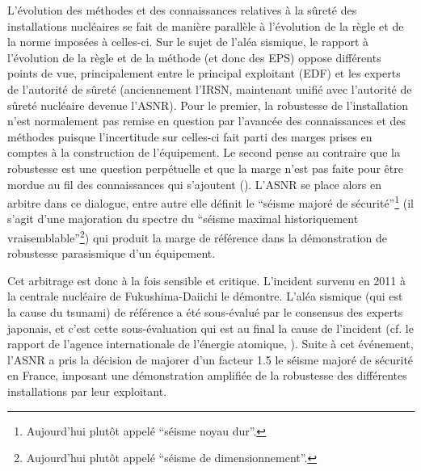 L'évolution des méthodes et des connaissances relatives à la sûreté des installations nucléaires se fait de manière parallèle à l'évolution de la règle et de la norme imposées à celles-ci. 
Sur le sujet de l'aléa sismique, le rapport à l'évolution de la règle et de la méthode (et donc des EPS) oppose différents points de vue, principalement entre le principal exploitant (EDF) et les experts de l'autorité de sûreté (anciennement l'IRSN, maintenant unifié avec l'autorité de sûreté nucléaire devenue l'ASNR). 
Pour le premier, la robustesse de l'installation n'est normalement pas remise en question par l'avancée des connaissances et des méthodes puisque l’incertitude sur celles-ci fait parti des marges prises en comptes à la construction de l'équipement. %
Le second pense au contraire que la robustesse est une question perpétuelle et que la marge n’est pas faite pour être mordue au fil des connaissances qui s’ajoutent (\cite{roger_seisme_2020}). 
L'ASNR se place alors en arbitre dans ce dialogue, entre autre elle définit le ``séisme majoré de sécurité''\footnote{Aujourd'hui plutôt appelé ``séisme noyau dur''.} (il s'agit d'une majoration du spectre du ``séisme maximal historiquement vraisemblable''\footnote{Aujourd'hui plutôt appelé ``séisme de dimensionnement''.}) qui produit la marge de référence dans la démonstration de robustesse parasismique d'un équipement. %
%


Cet arbitrage est donc à la fois sensible et critique.
L'incident survenu en 2011 à la centrale nucléaire de Fukushima-Daiichi le démontre. L'aléa sismique (qui est la cause du tsunami) de référence
a été sous-évalué par le consensus des experts japonais, et c'est cette sous-évaluation qui est au final la cause de l'incident (cf. le rapport de l'agence internationale de l'énergie atomique, \cite{iaea_fukushima_2015}).
Suite à cet événement, l'ASNR a pris la décision de majorer d'un facteur 1.5 le séisme majoré de sécurité en France, imposant une démonstration amplifiée de la robustesse des différentes installations par leur exploitant.




